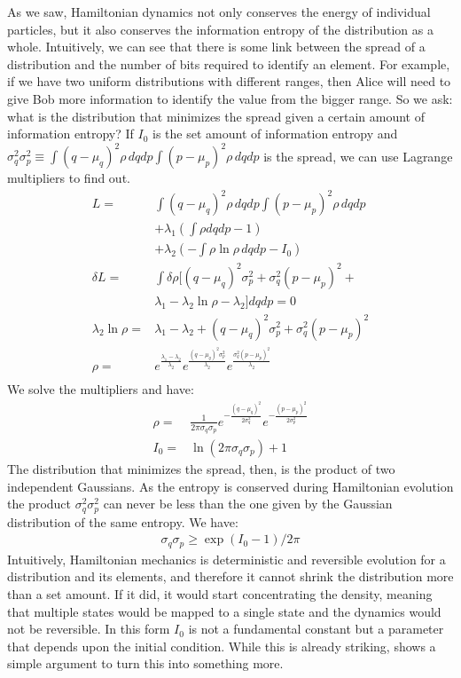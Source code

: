 \documentclass[11pt]{article}
\begin{document}
As we saw, Hamiltonian dynamics not only conserves the energy of individual particles, but it also conserves the information entropy of the distribution as a whole. Intuitively, we can see that there is some link between the spread of a distribution and the number of bits required to identify an element. For example, if we have two uniform distributions with different ranges, then Alice will need to give Bob more information to identify the value from the bigger range. So we ask: what is the distribution that minimizes the spread given a certain amount of information entropy? If $I_0$ is the set amount of information entropy and $\sigma_q^2 \sigma_p^2 \equiv \int (q-\mu_q)^2 \rho \, dqdp \int (p-\mu_p)^2 \rho \, dqdp$ is the spread, we can use Lagrange multipliers to find out.
\begin{align*}
L = &\int (q-\mu_q)^2 \rho \, dqdp \int (p-\mu_p)^2 \rho \, dqdp \\
&+ \lambda_1(\int \rho dqdp - 1) \\ &+ \lambda_2(- \int \rho \ln \rho \, dqdp - I_0)\\ 
\delta L = &\int \delta \rho [(q-\mu_q)^2 \sigma_p^2 + \sigma_q^2 (p-\mu_p)^2 + \\ &\lambda_1 - \lambda_2 \ln \rho - \lambda_2 ] dqdp = 0 \\
\lambda_2 \ln \rho = &\lambda_1 - \lambda_2 + (q-\mu_q)^2 \sigma_p^2 + \sigma_q^2 (p-\mu_p)^2 \\
\rho = &e^{\frac{\lambda_1 - \lambda_2}{\lambda_2}}e^{\frac{(q-\mu_q)^2 \sigma_p^2}{\lambda_2}}e^{\frac{\sigma_q^2 (p-\mu_p)^2}{\lambda_2}}\\
\end{align*}
We solve the multipliers and have:
\begin{align*}
\rho = &\frac{1}{ 2 \pi \sigma_q \sigma_p} e^{-\frac{(q-\mu_q)^2}{2\sigma_q^2}} e^{-\frac{(p-\mu_p)^2}{2\sigma_p^2}} \\
I_0 = &\ln (2\pi\sigma_q\sigma_p) + 1
\end{align*}
The distribution that minimizes the spread, then, is the product of two independent Gaussians. As the entropy is conserved during Hamiltonian evolution the product $\sigma_q^2 \sigma_p^2$ can never be less than the one given by the Gaussian distribution of the same entropy. We have:
\begin{align*}
\sigma_q\sigma_p \geq \exp (I_0 - 1) / 2 \pi 
\end{align*}
Intuitively, Hamiltonian mechanics is deterministic and reversible evolution for a distribution and its elements, and therefore it cannot shrink the distribution more than a set amount. If it did, it would start concentrating the density, meaning that multiple states would be mapped to a single state and the dynamics would not be reversible. In this form $I_0$ is not a fundamental constant but a parameter that depends upon the initial condition. While this is already striking, \cite{AoPPhy1} shows a simple argument to turn this into something more.
\end{document}
